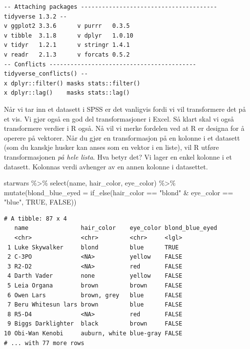 \documentclass[
  letterpaper,
  DIV=11,
  numbers=noendperiod]{scrreprt}
\newenvironment{Shaded}{\begin{snugshade}}{\end{snugshade}}
\newcommand{\AttributeTok}[1]{\textcolor[rgb]{0.40,0.45,0.13}{#1}}
\newcommand{\ConstantTok}[1]{\textcolor[rgb]{0.56,0.35,0.01}{#1}}
\newcommand{\FunctionTok}[1]{\textcolor[rgb]{0.28,0.35,0.67}{#1}}
\newcommand{\NormalTok}[1]{\textcolor[rgb]{0.00,0.23,0.31}{#1}}
\newcommand{\SpecialCharTok}[1]{\textcolor[rgb]{0.37,0.37,0.37}{#1}}
\newcommand{\StringTok}[1]{\textcolor[rgb]{0.13,0.47,0.30}{#1}}
\begin{document}
\begin{verbatim}
-- Attaching packages --------------------------------------- tidyverse 1.3.2 --
v ggplot2 3.3.6      v purrr   0.3.5 
v tibble  3.1.8      v dplyr   1.0.10
v tidyr   1.2.1      v stringr 1.4.1 
v readr   2.1.3      v forcats 0.5.2 
-- Conflicts ------------------------------------------ tidyverse_conflicts() --
x dplyr::filter() masks stats::filter()
x dplyr::lag()    masks stats::lag()
\end{verbatim}

Når vi tar inn et datasett i SPSS er det vanligvis fordi vi vil
transformere det på et vis. Vi gjør også en god del transformasjoner i
Excel. Så klart skal vi også transformere verdier i R også. Nå vil vi
merke fordelen ved at R er designa for å operere på vektorer. Når du
gjør en transformasjon på en kolonne i et datasett (som du kanskje
husker kan anses som en vektor i en liste), vil R utføre
transformasjonen \emph{på hele lista}. Hva betyr det? Vi lager en enkel
kolonne i et datasett. Kolonnas verdi avhenger av en annen kolonne i
datasettet.

\begin{Shaded}
\begin{Highlighting}[]
\NormalTok{starwars }\SpecialCharTok{\%\textgreater{}\%} 
  \FunctionTok{select}\NormalTok{(name, hair\_color, eye\_color) }\SpecialCharTok{\%\textgreater{}\%} 
  \FunctionTok{mutate}\NormalTok{(}\AttributeTok{blond\_blue\_eyed =} \FunctionTok{if\_else}\NormalTok{(hair\_color }\SpecialCharTok{==} \StringTok{"blond"} \SpecialCharTok{\&}\NormalTok{ eye\_color }\SpecialCharTok{==} \StringTok{"blue"}\NormalTok{, }\ConstantTok{TRUE}\NormalTok{, }\ConstantTok{FALSE}\NormalTok{))}
\end{Highlighting}
\end{Shaded}

\begin{verbatim}
# A tibble: 87 x 4
   name               hair_color    eye_color blond_blue_eyed
   <chr>              <chr>         <chr>     <lgl>          
 1 Luke Skywalker     blond         blue      TRUE           
 2 C-3PO              <NA>          yellow    FALSE          
 3 R2-D2              <NA>          red       FALSE          
 4 Darth Vader        none          yellow    FALSE          
 5 Leia Organa        brown         brown     FALSE          
 6 Owen Lars          brown, grey   blue      FALSE          
 7 Beru Whitesun lars brown         blue      FALSE          
 8 R5-D4              <NA>          red       FALSE          
 9 Biggs Darklighter  black         brown     FALSE          
10 Obi-Wan Kenobi     auburn, white blue-gray FALSE          
# ... with 77 more rows
\end{verbatim}
\end{document}
